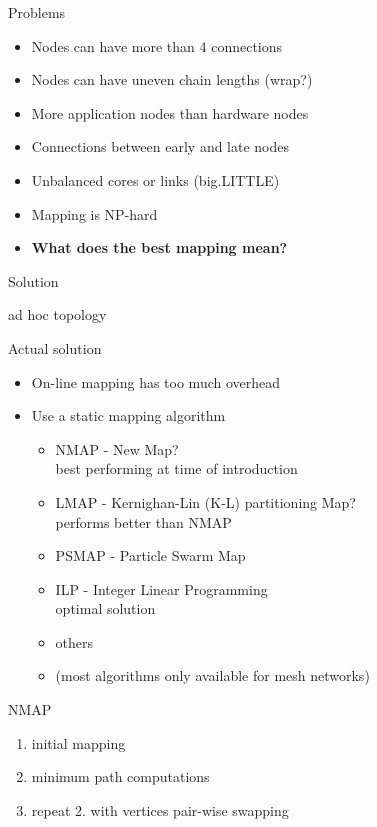 \documentclass{beamer}
\begin{document}
\begin{frame}{Problems}
	\begin{itemize}
		\item Nodes can have more than 4 connections
		\item Nodes can have uneven chain lengths (wrap?)
		\item More application nodes than hardware nodes
		\item Connections between early and late nodes
		\item Unbalanced cores or links (big.LITTLE)
		\item Mapping is NP-hard
		\item \textbf{What does the best mapping mean?}
	\end{itemize}
\end{frame}

\begin{frame}{Solution}
	\begin{center}
		\huge ad hoc topology
	\end{center}
\end{frame}

\begin{frame}{Actual solution}
	\begin{itemize}
		\item On-line mapping has too much overhead
		\item Use a static mapping algorithm
			\begin{itemize}
				\item NMAP - New Map? \\
					best performing at time of introduction
				\item LMAP - Kernighan-Lin (K-L) partitioning Map? \\
					performs better than NMAP
				\item PSMAP - Particle Swarm Map
				\item ILP - Integer Linear Programming \\
					optimal solution
				\item others
				\item (most algorithms only available for mesh networks)
			\end{itemize}
	\end{itemize}
\end{frame}

\begin{frame}{NMAP}
	\begin{enumerate}
		\item initial mapping
		\item minimum path computations
		\item repeat 2. with vertices pair-wise swapping
	\end{enumerate}
\end{frame}
\end{document}
